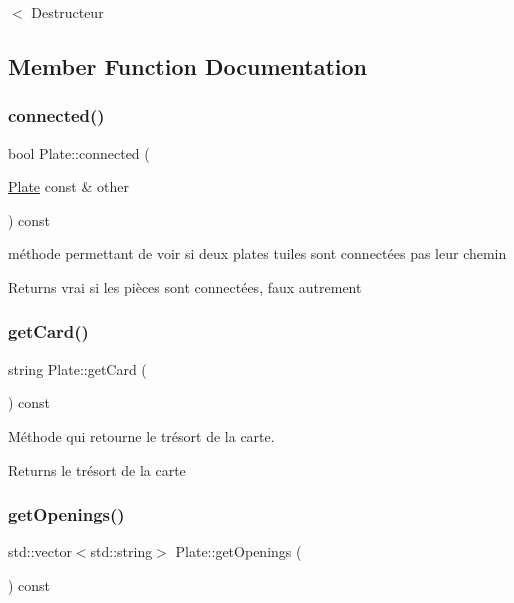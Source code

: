 $<$ Destructeur 

\subsection{Member Function Documentation}
\mbox{\label{class_plate_a2a0f4f57590ffec3305617072bb9dd33}} 
\subsubsection{\texorpdfstring{connected()}{connected()}}
{\footnotesize\ttfamily bool Plate\+::connected (\begin{DoxyParamCaption}\item[{\mbox{\hyperlink{class_plate}{Plate}} const \&}]{other }\end{DoxyParamCaption}) const}

méthode permettant de voir si deux plates tuiles sont connectées pas leur chemin \begin{DoxyReturn}{Returns}
vrai si les pièces sont connectées, faux autrement 
\end{DoxyReturn}
\mbox{\label{class_plate_afe793f974b124b90ee799f92de166eac}} 
\subsubsection{\texorpdfstring{getCard()}{getCard()}}
{\footnotesize\ttfamily string Plate\+::get\+Card (\begin{DoxyParamCaption}{ }\end{DoxyParamCaption}) const\hspace{0.3cm}{\ttfamily [inline]}}

Méthode qui retourne le trésort de la carte. \begin{DoxyReturn}{Returns}
le trésort de la carte 
\end{DoxyReturn}
\mbox{\label{class_plate_a05230b33562e66bd87d530eb4915c415}} 
\subsubsection{\texorpdfstring{getOpenings()}{getOpenings()}}
{\footnotesize\ttfamily std\+::vector$<$std\+::string$>$ Plate\+::get\+Openings (\begin{DoxyParamCaption}{ }\end{DoxyParamCaption}) const\hspace{0.3cm}{\ttfamily [inline]}}

